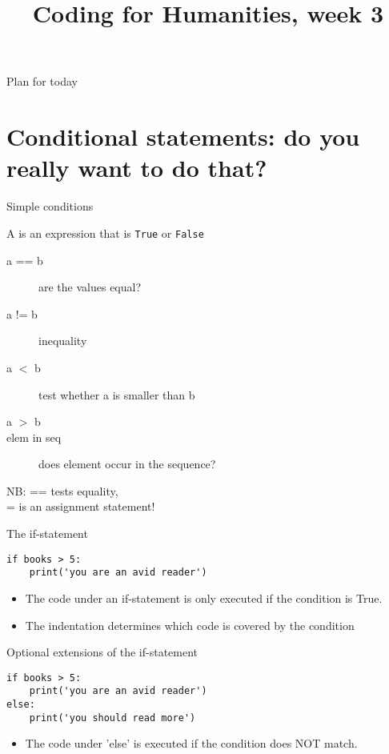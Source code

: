 \documentclass[aspectratio=169,usenames,dvipsnames]{beamer}
\title{Coding for Humanities, week 3}
\begin{document}
\begin{frame}
 \titlepage
\end{frame}

\begin{frame}{Plan for today}
 \tableofcontents
\end{frame}

\section{Conditional statements: do you really want to do that?}
\frame{\tableofcontents[currentsection]}

\begin{frame}{Simple conditions}
    \begin{definition}
        A  is
        an expression that is \texttt{True} or \texttt{False}
    \end{definition}
    \begin{description}
        \item[a == b] are the values equal?
        \item[a != b] inequality
        \item[a $<$ b] test whether a is smaller than b
        \item[a $>$ b]
        \item[elem in seq] does element occur in the sequence?
    \end{description}

    NB: == tests equality, \\
        = is an assignment statement!
\end{frame}

\begin{frame}[fragile]{The if-statement}
\begin{lstlisting}
if books > 5:
    print('you are an avid reader')
\end{lstlisting}

\begin{itemize}
    \item The code under an if-statement is only executed
        if the condition is True.
    \item The indentation determines which code is covered
        by the condition
\end{itemize}
\end{frame}


\begin{frame}[fragile]{Optional extensions of the if-statement}
\begin{lstlisting}
if books > 5:
    print('you are an avid reader')
else:
    print('you should read more')
\end{lstlisting}

\begin{itemize}
    \item The code under 'else' is executed if the condition does NOT match.
\end{itemize}
\end{frame}
\end{document}
